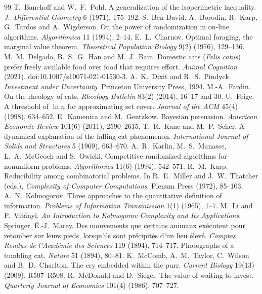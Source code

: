 \documentclass[11pt,a4paper]{article}
\theoremstyle{plain}
\theoremstyle{definition}
\theoremstyle{remark}
\numberwithin{equation}{section}
\begin{document}
\begin{thebibliography}{99}
\small
{} T.~Banchoff and W.~F.~Pohl. A generalization of the isoperimetric inequality. \emph{J.\ Differential Geometry} 6 (1971), 175--192.
 S.~Ben-David, A.~Borodin, R.~Karp, G.~Tardos and A.~Wigderson. On the power of randomization in on-line algorithms. \emph{Algorithmica} 11 (1994), 2--14.
 E.~L.~Charnov. Optimal foraging, the marginal value theorem. \emph{Theoretical Population Biology} 9(2) (1976), 129--136.
 M.~M.~Delgado, B.~S.~G.~Han and M.~J.~Bain. Domestic cats (\emph{Felis catus}) prefer freely available food over food that requires effort. \emph{Animal Cognition} (2021). doi:10.1007/s10071-021-01530-3.
 A.~K.~Dixit and R.~S.~Pindyck. \emph{Investment under Uncertainty}. Princeton University Press, 1994.
 M.-A.~Fardin. On the rheology of cats. \emph{Rheology Bulletin} 83(2) (2014), 16--17 and 30.
 U.~Feige. A threshold of $\ln n$ for approximating set cover. \emph{Journal of the ACM} 45(4) (1998), 634--652.
 E.~Kamenica and M.~Gentzkow. Bayesian persuasion. \emph{American Economic Review} 101(6) (2011), 2590--2615.
 T.~R.~Kane and M.~P.~Scher. A dynamical explanation of the falling cat phenomenon. \emph{International Journal of Solids and Structures} 5 (1969), 663--670.
 A.~R.~Karlin, M.~S.~Manasse, L.~A.~McGeoch and S.~Owicki. Competitive randomized algorithms for nonuniform problems. \emph{Algorithmica} 11(6) (1994), 542--571.
 R.~M.~Karp. Reducibility among combinatorial problems. In R.~E.~Miller and J.~W.~Thatcher (eds.), \emph{Complexity of Computer Computations}. Plenum Press (1972), 85--103.
 A.~N.~Kolmogorov. Three approaches to the quantitative definition of information. \emph{Problems of Information Transmission} 1(1) (1965), 1--7.
 M.~Li and P.~Vitányi. \emph{An Introduction to Kolmogorov Complexity and Its Applications}. Springer.
 É.-J.~Marey. Des mouvements que certains animaux exécutent pour retomber sur leurs pieds, lorsqu'ils sont précipités d'un lieu élevé. \emph{Comptes Rendus de l'Académie des Sciences} 119 (1894), 714--717.
 Photographs of a tumbling cat. \emph{Nature} 51 (1894), 80--81.
 K.~McComb, A.~M.~Taylor, C.~Wilson and B.~D.~Charlton. The cry embedded within the purr. \emph{Current Biology} 19(13) (2009), R507--R508.
 R.~McDonald and D.~Siegel. The value of waiting to invest. \emph{Quarterly Journal of Economics} 101(4) (1986), 707--727.

\end{thebibliography}
\end{document}
